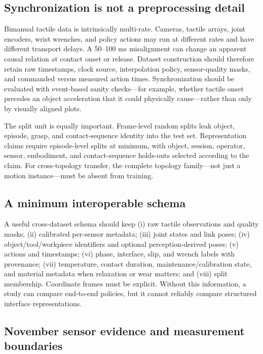 \subsection{Synchronization is not a preprocessing detail}

Bimanual tactile data is intrinsically multi-rate. Cameras, tactile arrays,
joint encoders, wrist wrenches, and policy actions may run at different rates and
have different transport delays. A 50--100 ms misalignment can change an apparent
causal relation at contact onset or release. Dataset construction should therefore
retain raw timestamps, clock source, interpolation policy, sensor-quality masks,
and commanded versus measured action times. Synchronization should be evaluated
with event-based sanity checks---for example, whether tactile onset precedes an
object acceleration that it could physically cause---rather than only by visually
aligned plots.

The split unit is equally important. Frame-level random splits leak object,
episode, grasp, and contact-sequence identity into the test set. Representation
claims require episode-level splits at minimum, with object, session, operator,
sensor, embodiment, and contact-sequence holds-outs selected according to the
claim. For cross-topology transfer, the complete topology family---not just a
motion instance---must be absent from training.

\subsection{A minimum interoperable schema}

A useful cross-dataset schema should keep (i) raw tactile observations and
quality masks; (ii) calibrated per-sensor metadata; (iii) joint states and link
poses; (iv) object/tool/workpiece identifiers and optional perception-derived
  poses; (v) actions and timestamps; (vi) phase, interface, slip, and wrench labels
  with provenance; (vii) temperature, contact duration, maintenance/calibration
  state, and material metadata when relaxation or wear matters; and (viii) split
  membership. Coordinate frames must be explicit.
Without this information, a study can compare end-to-end policies, but it cannot
reliably compare structured interface representations.


\subsection{November sensor evidence and measurement boundaries}

